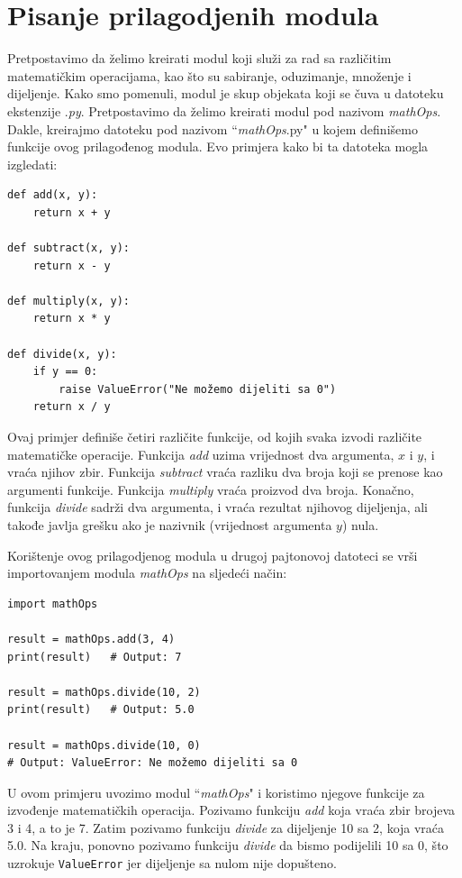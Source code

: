  
\section{Pisanje prilagodjenih modula}

Pretpostavimo da želimo kreirati modul koji služi za rad sa različitim mate\-matičkim operacijama, kao što su sabiranje, oduzimanje, množenje i dijeljenje. Kako smo pomenuli, modul je skup objekata koji se  čuva u datoteku ekstenzije .\textit{py}. Pretpostavimo da želimo kreirati modul pod nazivom \textit{mathOps}. Dakle, kreirajmo  datoteku pod nazivom ``\textit{mathOps}.py" u kojem definišemo funkcije ovog prilagođenog modula. Evo primjera kako bi ta datoteka mogla izgledati:

\begin{verbatim}
def add(x, y):
    return x + y

def subtract(x, y):
    return x - y

def multiply(x, y):
    return x * y

def divide(x, y):
    if y == 0:
        raise ValueError("Ne možemo dijeliti sa 0")
    return x / y
\end{verbatim}
Ovaj  primjer definiše četiri različite funkcije, od kojih svaka izvodi različite matematičke operacije. Funkcija \textit{add} uzima vrijednost dva argumenta, $x$ i $y$, i vraća njihov zbir. Funkcija \textit{subtract}   vraća razliku dva broja koji se prenose kao argumenti funkcije. Funkcija \textit{multiply} vraća proizvod dva broja. Konačno, funkcija \textit{divide} sadrži dva argumenta, i vraća rezultat njihovog dijeljenja, ali takođe  javlja  grešku ako je nazivnik (vrijednost argumenta $y$) nula.

Korištenje ovog prilagodjenog modula u drugoj pajtonovoj datoteci se vrši importovanjem modula \textit{mathOps} na sljedeći način:

\begin{verbatim}
import mathOps

result = mathOps.add(3, 4)
print(result)   # Output: 7

result = mathOps.divide(10, 2)
print(result)   # Output: 5.0

result = mathOps.divide(10, 0)
# Output: ValueError: Ne možemo dijeliti sa 0
\end{verbatim}

U ovom primjeru uvozimo modul ``\textit{mathOps}" i koristimo njegove funkcije za izvođenje matematičkih operacija. Pozivamo funkciju  \textit{add}  koja vraća zbir brojeva 3 i 4, a to je 7. Zatim pozivamo funkciju  \textit{divide}  za dijeljenje 10 sa 2, koja vraća 5.0. Na kraju, ponovno pozivamo funkciju  \textit{divide}  da bismo podijelili 10 sa 0, što uzrokuje \texttt{ValueError} jer dijeljenje sa nulom nije dopušteno.


